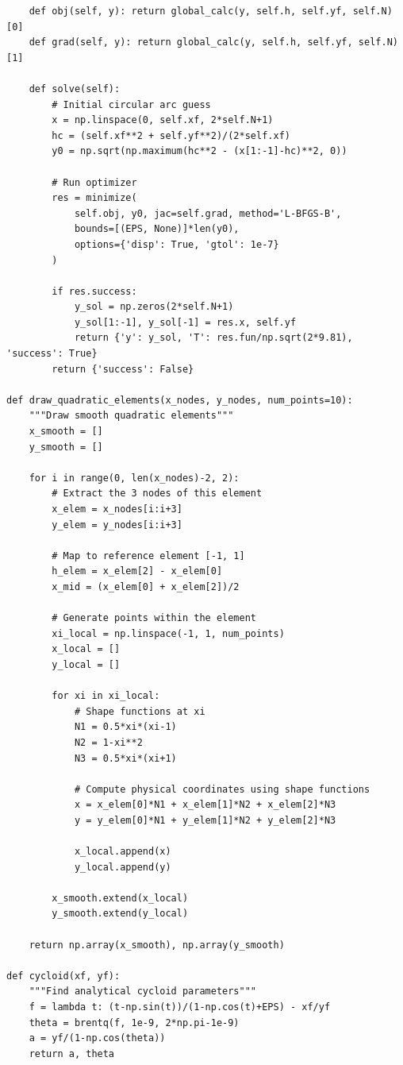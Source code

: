 \documentclass[11pt]{article}
\begin{document}
\begin{verbatim}
    def obj(self, y): return global_calc(y, self.h, self.yf, self.N)[0]
    def grad(self, y): return global_calc(y, self.h, self.yf, self.N)[1]

    def solve(self):
        # Initial circular arc guess
        x = np.linspace(0, self.xf, 2*self.N+1)
        hc = (self.xf**2 + self.yf**2)/(2*self.xf)
        y0 = np.sqrt(np.maximum(hc**2 - (x[1:-1]-hc)**2, 0))

        # Run optimizer
        res = minimize(
            self.obj, y0, jac=self.grad, method='L-BFGS-B',
            bounds=[(EPS, None)]*len(y0),
            options={'disp': True, 'gtol': 1e-7}
        )

        if res.success:
            y_sol = np.zeros(2*self.N+1)
            y_sol[1:-1], y_sol[-1] = res.x, self.yf
            return {'y': y_sol, 'T': res.fun/np.sqrt(2*9.81), 'success': True}
        return {'success': False}

def draw_quadratic_elements(x_nodes, y_nodes, num_points=10):
    """Draw smooth quadratic elements"""
    x_smooth = []
    y_smooth = []

    for i in range(0, len(x_nodes)-2, 2):
        # Extract the 3 nodes of this element
        x_elem = x_nodes[i:i+3]
        y_elem = y_nodes[i:i+3]

        # Map to reference element [-1, 1]
        h_elem = x_elem[2] - x_elem[0]
        x_mid = (x_elem[0] + x_elem[2])/2

        # Generate points within the element
        xi_local = np.linspace(-1, 1, num_points)
        x_local = []
        y_local = []

        for xi in xi_local:
            # Shape functions at xi
            N1 = 0.5*xi*(xi-1)
            N2 = 1-xi**2
            N3 = 0.5*xi*(xi+1)

            # Compute physical coordinates using shape functions
            x = x_elem[0]*N1 + x_elem[1]*N2 + x_elem[2]*N3
            y = y_elem[0]*N1 + y_elem[1]*N2 + y_elem[2]*N3

            x_local.append(x)
            y_local.append(y)

        x_smooth.extend(x_local)
        y_smooth.extend(y_local)

    return np.array(x_smooth), np.array(y_smooth)

def cycloid(xf, yf):
    """Find analytical cycloid parameters"""
    f = lambda t: (t-np.sin(t))/(1-np.cos(t)+EPS) - xf/yf
    theta = brentq(f, 1e-9, 2*np.pi-1e-9)
    a = yf/(1-np.cos(theta))
    return a, theta


\end{verbatim}
\end{document}

